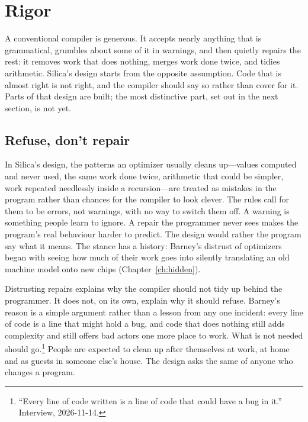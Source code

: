 \chapter{Rigor}
\label{ch:refuses}

A conventional compiler is generous. It accepts nearly anything that is
grammatical, grumbles about some of it in warnings, and then quietly repairs
the rest: it removes work that does nothing, merges work done twice, and
tidies arithmetic. Silica's design starts from the opposite assumption. Code
that is almost right is not right, and the compiler should say so rather than
cover for it. Parts of that design are built; the most distinctive part, set out
in the next section, is not yet.

\section{Refuse, don't repair}

In Silica's design, the patterns an optimizer usually cleans up---values
computed and never used, the same work done twice, arithmetic that could be
simpler, work repeated needlessly inside a recursion---are treated as mistakes
in the program rather than chances for the compiler to look clever. The rules
call for them to be errors, not warnings, with no way to switch them off. A
warning is something people learn to ignore. A repair the programmer never sees
makes the program's real behaviour harder to predict. The design would rather
the program say what it means. The stance has a history: Barney's distrust of
optimizers began with seeing how much of their work goes into silently
translating an old machine model onto new chips (Chapter~\ref{ch:hidden}).

Distrusting repairs explains why the compiler should not tidy up behind the
programmer. It does not, on its own, explain why it should refuse. Barney's
reason is a simple argument rather than a lesson from any one incident: every
line of code is a line that might hold a bug, and code that does nothing still
adds complexity and still offers bad actors one more place to work. What is not
needed should go.\footnote{``Every line of code written is a line of code that
could have a bug in it.'' Interview, 2026-11-14.} People are expected to clean
up after themselves at work, at home and as guests in someone else's house. The
design asks the same of anyone who changes a program.

